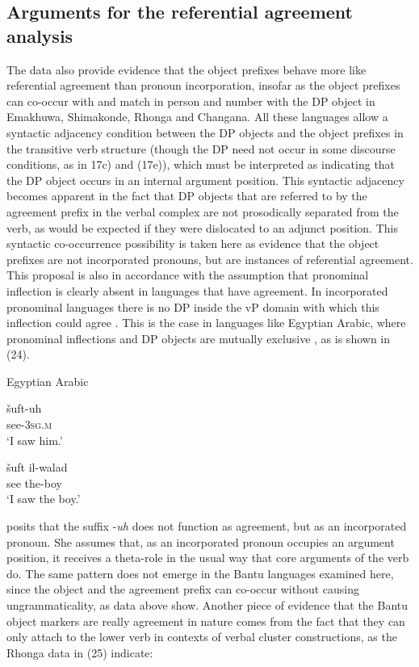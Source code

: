\documentclass[output=paper]{langsci/langscibook}
\begin{document}
\subsection{Arguments for the referential agreement analysis}

The data also provide evidence that the object prefixes behave more like referential agreement than pronoun incorporation, insofar as the object prefixes can co-occur with and match in person and number with the DP object in Emakhuwa, Shimakonde, Rhonga and Changana. All these languages allow a syntactic adjacency condition between the DP objects and the object prefixes in the transitive verb structure (though the DP need not occur in some discourse conditions, as in 17c) and (17e)), which must be interpreted as indicating that the DP object occurs in an internal argument position. This syntactic adjacency becomes apparent in the fact that DP objects that are referred to by the agreement prefix in the verbal complex are not prosodically separated from the verb, as would be expected if they were dislocated to an adjunct position. This syntactic co-occurrence possibility is taken here as evidence that the object prefixes are not incorporated pronouns, but are instances of referential agreement. This proposal is also in accordance with the assumption that pronominal inflection is clearly absent in languages that have agreement. In incorporated pronominal languages there is no DP inside the vP domain with which this inflection could agree \citep{Jelinek1989}. This is the case in languages like Egyptian Arabic, where pronominal inflections and DP objects are mutually exclusive \citep{Jelinek1989}, as is shown in (24).

{Egyptian Arabic}

\ea
\gll šuft-uh\\
     see-\textsc{3sg.m}\\
\glt ‘I saw him.’
\z

\ea
\gll šuft           il-walad\\
     see           the-boy\\
\glt ‘I saw the boy.’
\z

\citet{Jelinek1989} posits that the suffix -{\textit{uh}} does not function as agreement, but as an incorporated pronoun. She assumes that, as an incorporated pronoun occupies an argument position, it receives {a theta}{}-role in the usual way that core arguments of the verb do. The same pattern does not emerge in the Bantu languages examined here, since the object and the agreement prefix can co-occur without causing ungrammaticality, as data above show. Another piece of evidence that the Bantu object markers are really agreement in nature comes from the fact that they can only attach to the lower verb in contexts of verbal cluster constructions, as the Rhonga data in (25) indicate:
\end{document}
